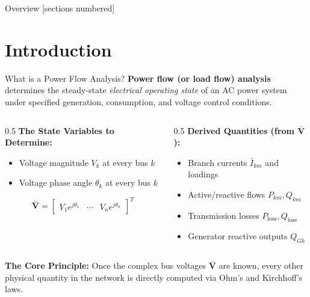 \titleframe

\begin{frame}{Overview}
  [sections numbered]
  \tableofcontents[hideallsubsections]
\end{frame}

\section{Introduction}

\begin{frame}{What is a Power Flow Analysis?}
    \textbf{Power flow (or load flow) analysis} determines the steady-state \textit{electrical operating state} of an AC power system under specified generation, consumption, and voltage control conditions.
    
    \begin{columns}
        \begin{column}{0.5\textwidth}
            \textbf{The State Variables to Determine:}
            \begin{itemize}
                \item Voltage magnitude $V_k$ at every bus $k$
                \item Voltage phase angle $\theta_k$ at every bus $k$
            \end{itemize}
            \vspace{0.15cm}
            $$\mathbf{\bar{V}} = \begin{bmatrix} V_1 e^{j\theta_1} & \cdots & V_n e^{j\theta_n} \end{bmatrix}^T$$
        \end{column}
        \begin{column}{0.5\textwidth}
            \textbf{Derived Quantities (from $\mathbf{\bar{V}}$):}
            \begin{itemize}
                \item Branch currents $\bar{I}_{km}$ and loadings
                \item Active/reactive flows $P_{km}, Q_{km}$
                \item Transmission losses $P_{\text{loss}}, Q_{\text{loss}}$
                \item Generator reactive outputs $Q_{Gk}$
            \end{itemize}
        \end{column}
    \end{columns}
    
    \vspace{0.25cm}
    \textbf{The Core Principle:} Once the complex bus voltages $\mathbf{\bar{V}}$ are known, every other physical quantity in the network is directly computed via Ohm's and Kirchhoff's laws.
\end{frame}

